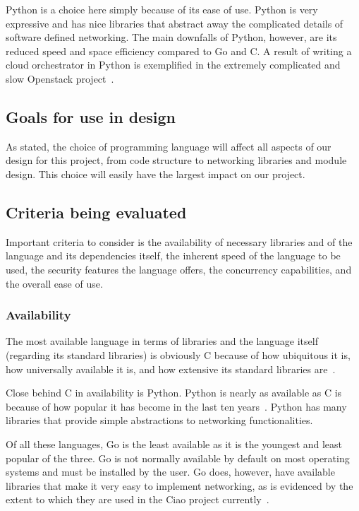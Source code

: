 \documentclass[10pt,letterpaper,onecolumn,journal]{IEEEtran}
\begin{document}
Python is a choice here simply because of its ease of use. Python is very
expressive and has nice libraries that abstract away the complicated details of
software defined networking. The main downfalls of Python, however, are its
reduced speed and space efficiency compared to Go and C. A result of writing a
cloud orchestrator in Python is exemplified in the extremely complicated and
slow Openstack project~\cite{uglyopenstack}.

\subsection{Goals for use in design}

As stated, the choice of programming language will affect all aspects of our
design for this project, from code structure to networking libraries and module
design. This choice will easily have the largest impact on our project.

\subsection{Criteria being evaluated}

Important criteria to consider is the availability of necessary libraries and of
the language and its dependencies itself, the inherent speed of the language to
be used, the security features the language offers, the concurrency
capabilities, and the overall ease of use.

\subsubsection{Availability}

The most available language in terms of libraries and the language itself
(regarding its standard libraries) is obviously C because of how ubiquitous it
is, how universally available it is, and how extensive its standard libraries
are~\cite{SOC}.

Close behind C in availability is Python. Python is nearly as available as C is
because of how popular it has become in the last ten years~\cite{PYPL}. Python
has many libraries that provide simple abstractions to networking
functionalities.

Of all these languages, Go is the least available as it is the youngest and
least popular of the three. Go is not normally available by default on most
operating systems and must be installed by the user. Go does, however, have
available libraries that make it very easy to implement networking, as is
evidenced by the extent to which they are used in the Ciao project
currently~\cite{ciao}.
\end{document}
